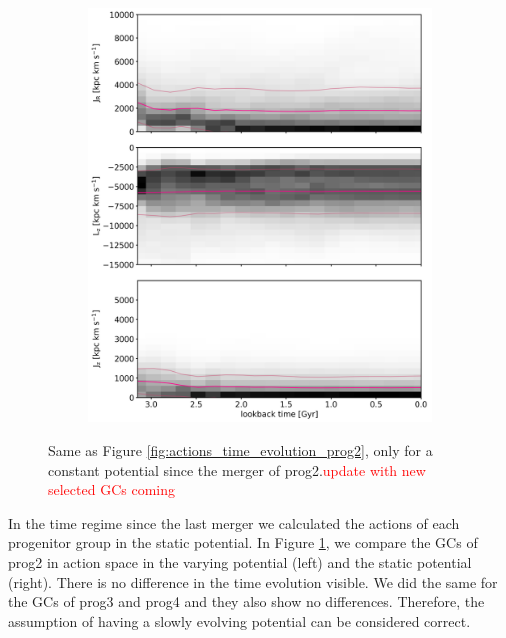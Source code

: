 \begin{figure}[htbp]
\begin{subfigure}[c]{0.48\textwidth}
	    \includegraphics[width=\textwidth]{plots/Dynamics/prog2/action_wodisk_time_evolution_hist_mean_static_pot.png}
    \end{subfigure}
    \caption{Same as Figure \ref{fig:actions_time_evolution_prog2}, only for a constant potential since the merger of prog2.\textcolor{red}{update with new selected GCs coming}}\label{fig:comparison_actions_time_evolution_mean_pot_prog2}
\end{figure}
In the time regime since the last merger we calculated the actions of each progenitor group in the static potential. In Figure \ref{fig:comparison_actions_time_evolution_mean_pot_prog2}, we compare the \acp{GC} of prog2 in action space in the varying potential (left) and the static potential (right). There is no difference in the time evolution visible. We did the same for the \acp{GC} of prog3 and prog4 and they also show no differences. Therefore, the assumption of having a slowly evolving potential can be considered correct.
\iffalse
